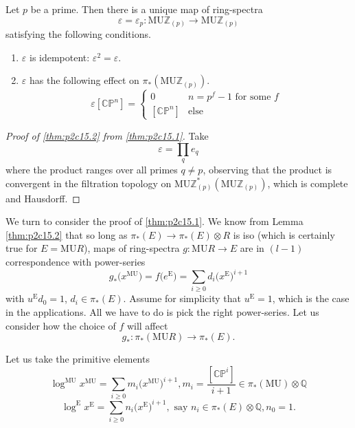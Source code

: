 \documentclass[../main]{subfiles}
\begin{document}
\begin{theorem}
\label{thm:p2c15.2}
Let $p$ be a prime. Then there is a unique map of ring-spectra \[\varepsilon=\varepsilon_p:\mathrm{MU}\mathbb{Z}_{(p)}\to\mathrm{MU}\mathbb{Z}_{(p)}\] satisfying the following conditions.
\begin{enumerate}
    \item $\varepsilon$ is idempotent: $\varepsilon^2=\varepsilon$.
    \item $\varepsilon$ has the following effect on $\pi_\ast(\mathrm{MU}\mathbb{Z}_{(p)})$. 
    \[\varepsilon[\mathbb{CP}^n]=
        \begin{cases}
            0 & n=p^f-1\text{ for some }f\\
            [\mathbb{CP}^n] & \mathrm{else}
        \end{cases}\]
\end{enumerate}
\end{theorem}  

\begin{proof}[Proof of \eqref{thm:p2c15.2} from \eqref{thm:p2c15.1}]
Take \[\varepsilon=\prod_qe_q\] where the product ranges over all primes $q\neq p$, observing that the product is convergent in the filtration topology on $\mathrm{MU}\mathbb{Z}_{(p)}^\ast(\mathrm{MU}\mathbb{Z}_{(p)})$, which is complete and Hausdorff.
\end{proof}

We turn to consider the proof of \eqref{thm:p2c15.1}. We know from Lemma \eqref{thm:p2c15.2} that so long as $\pi_\ast(E)\longrightarrow\pi_\ast(E)\otimes R$ is iso (which is certainly true
for $E = \mathrm{MU}R$), maps of ring-spectra $g:\mathrm{MU}R\longrightarrow E$ are in $(l-1)$ correspondence with power-series \[g_\ast\big(x^{\mathrm{MU}}\big)=f\big(e^\mathrm{E}\big)=\sum_{i\geq 0}d_i\big(x^{\mathrm{E}}\big)^{i+1}\] with $u^{\mathrm{E}}d_0=1$, $d_i\in\pi_\ast(E)$. Assume for simplicity that $u^{\mathrm{E}} = 1$, which is the case in the applications. All we have to do is pick the right power-series. Let us consider how the choice of $f$ will affect \[g_\ast:\pi_\ast(\mathrm{MU}R)\longrightarrow\pi_\ast(E).\]

Let us take the primitive elements
\[\log^{\mathrm{MU}}x^{\mathrm{MU}}=\sum_{i\geq0}m_i\big(x^{\mathrm{MU}}\big)^{i+1}, m_i=\dfrac{[\mathbb{CP}^i]}{i+1}\in\pi_\ast(\mathrm{MU})\otimes\mathbb{Q}\]
\[\log^{\mathrm{E}}x^{\mathrm{E}}=\sum_{i\geq0}n_i\big(x^{\mathrm{E}}\big)^{i+1},\text{ say }n_i\in\pi_\ast(E)\otimes\mathbb{Q},n_0=1.\]
\end{document}
